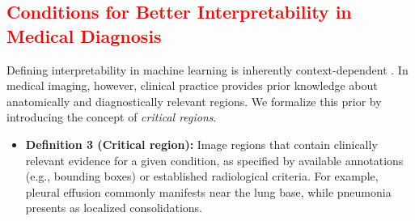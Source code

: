 \documentclass[preprint,7pt, a4paper]{elsarticle}
\begin{document}
\subsection{\textcolor{red}{Conditions for Better Interpretability in Medical Diagnosis}}

\begin{table}
    \centering
    \caption{\textcolor{black}{List of abbreviations and their corresponding explanations used in this study.}}
    \label{tab:abbr}
\end{table}

Defining interpretability in machine learning is inherently context-dependent \cite{43}. In medical imaging, however, clinical practice provides prior knowledge about anatomically and diagnostically relevant regions. We formalize this prior by introducing the concept of \emph{critical regions}.

\begin{itemize}
    \item \textbf{Definition 3 (Critical region):} Image regions that contain clinically relevant evidence for a given condition, as specified by available annotations (e.g., bounding boxes) or established radiological criteria. For example, pleural effusion commonly manifests near the lung base, while pneumonia presents as localized consolidations.
\end{itemize}
\end{document}
